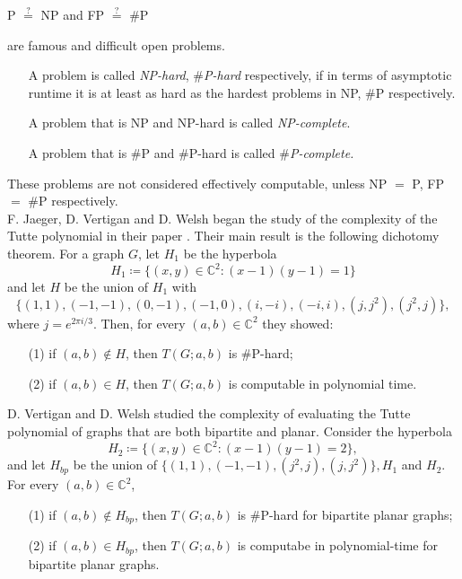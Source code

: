 \documentclass[12pt,a4paper, twoside, autooneside=false]{scrartcl}
\theoremstyle{definition}
\theoremstyle{remark}
\numberwithin{equation}{section}
\begin{document}
 \begin{center}
P $\overset{?}{=}$ NP and FP $\overset{?}{=}$ $\#$P
\end{center} are famous and difficult open problems.
\begin{itemize}
\item[]
A problem is called \textit{NP-hard}, $\mathit{\#}$\textit{P-hard} respectively,
if in terms of asymptotic runtime it is at least as hard as the hardest problems in NP, $\#$P respectively.
\item[]A problem that is NP and NP-hard is called \textit{NP-complete}. 
\item[]A problem that is $\#$P and $\#$P-hard is called $\mathit{\#}$\textit{P-complete.}
\end{itemize}
These problems are not considered effectively computable, unless NP $=$ P, FP $=$ $\#$P respectively. \\
\indent F. Jaeger, D. Vertigan and D. Welsh began the study of the complexity of the Tutte polynomial in their paper \cite{JaVeWe1990}. Their main result is the following dichotomy theorem. For a graph $G$, let $H_1$ be the hyperbola \[
H_1 \coloneqq \{(x,y) \in \mathbb{C}^2 : (x - 1)(y - 1) = 1\}
\]
and let $H$ be the union of $H_1$ with 
\[
\{(1,1) , (-1,-1), (0,-1), (-1,0), (i, -i), (-i,i), (j,j^2), (j^2,j)\},
\]
where $j = e^{2\pi i / 3}.$ Then, for every $(a,b) \in \mathbb{C}^2$ they showed:
\begin{itemize}
\item[(1)] if $(a,b) \not \in H$, then $T(G;a,b)$ is $\#$P-hard; 
\item[(2)] if $(a,b) \in H$, then $T(G;a,b)$ is computable in polynomial time.
\end{itemize} 
D. Vertigan and D. Welsh \cite{VW1992} studied the complexity of evaluating the Tutte polynomial of graphs that are both bipartite and planar. Consider the hyperbola 
\[
H_2 \coloneqq \{(x,y) \in \mathbb{C}^2: (x-1)(y-1) = 2\},
\]
and let $H_{bp}$ be the union of $\{(1,1), (-1,-1), (j^2,j), (j,j^2)\}, H_1$ and $H_2$. For every $(a,b) \in \mathbb{C}^2$, 
\begin{itemize}
\item[(1)] if $(a,b) \not \in H_{bp}$, then $T(G;a,b)$ is $\#$P-hard for bipartite planar graphs; 
\item[(2)] if $(a,b) \in H_{bp}$, then $T(G;a,b)$ is computabe in polynomial-time for bipartite planar graphs.
\end{itemize}
\end{document}
